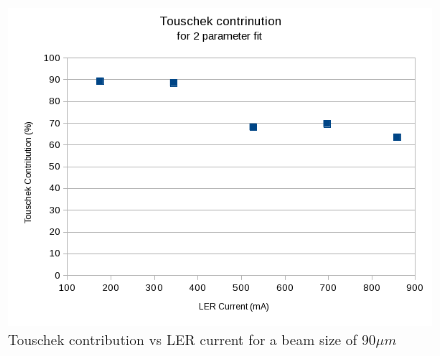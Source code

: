 \begin{figure}
	\centerfloat
		\includegraphics[width=\textwidth]{images/touschekPercent}
	\caption{Touschek contribution vs LER current for a beam size of 90$\mu m$}	
	\label{fig:TouschekContribLER}
\end{figure}


